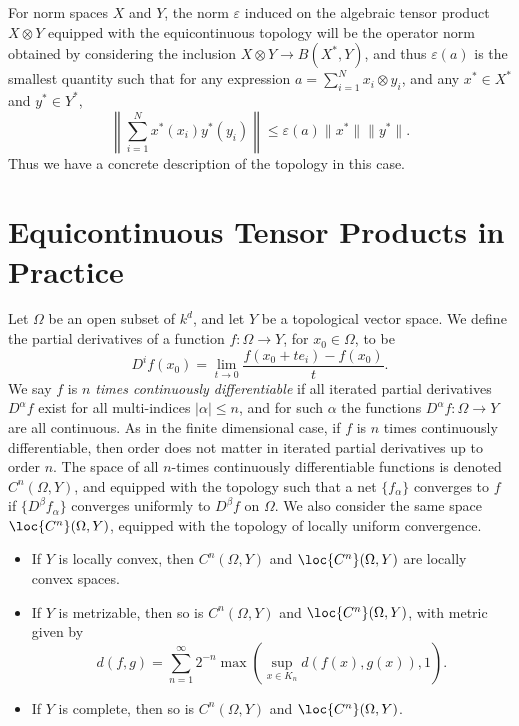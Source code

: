 For norm spaces $X$ and $Y$, the norm $\varepsilon$ induced on the algebraic tensor product $X \otimes Y$ equipped with the equicontinuous topology will be the operator norm obtained by considering the inclusion $X \otimes Y \to B(X^*,Y)$, and thus $\varepsilon(a)$ is the smallest quantity such that for any expression $a = \sum_{i = 1}^N x_i \otimes y_i$, and any $x^* \in X^*$ and $y^* \in Y^*$,
%
\[ \left\| \sum_{i = 1}^N x^*(x_i) y^*(y_i) \right\| \leq \varepsilon(a) \| x^* \| \| y^* \|.  \]
%
Thus we have a concrete description of the topology in this case.

\section{Equicontinuous Tensor Products in Practice}

Let $\Omega$ be an open subset of $k^d$, and let $Y$ be a topological vector space. We define the partial derivatives of a function $f: \Omega \to Y$, for $x_0 \in \Omega$, to be
%
\[ D^i f(x_0) = \lim_{t \to 0} \frac{f(x_0 + t e_i) - f(x_0)}{t}. \]
%
We say $f$ is \emph{$n$ times continuously differentiable} if all iterated partial derivatives $D^\alpha f$ exist for all multi-indices $|\alpha| \leq n$, and for such $\alpha$ the functions $D^\alpha f: \Omega \to Y$ are all continuous. As in the finite dimensional case, if $f$ is $n$ times continuously differentiable, then order does not matter in iterated partial derivatives up to order $n$. The space of all $n$-times continuously differentiable functions is denoted $C^n(\Omega,Y)$, and equipped with the topology such that a net $\{ f_\alpha \}$ converges to $f$ if $\{ D^\beta f_\alpha \}$ converges uniformly to $D^\beta f$ on $\Omega$. We also consider the same space $\loc{C^n}(\Omega,Y)$, equipped with the topology of locally uniform convergence.
%
\begin{itemize}
    \item If $Y$ is locally convex, then $C^n(\Omega,Y)$ and $\loc{C^n}(\Omega,Y)$ are locally convex spaces.

    \item If $Y$ is metrizable, then so is $C^n(\Omega,Y)$ and $\loc{C^n}(\Omega,Y)$, with metric given by
    \[ d(f,g) = \sum_{n = 1}^\infty 2^{-n} \max \left( \sup_{x \in K_n} d(f(x),g(x)), 1 \right). \]

    \item If $Y$ is complete, then so is $C^n(\Omega,Y)$ and $\loc{C^n}(\Omega,Y)$.
\end{itemize}

